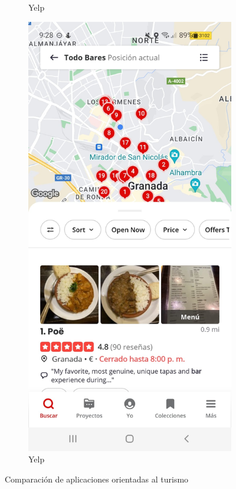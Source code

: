 \begin{figure}[H]
\begin{subfigure}{.3\textwidth}
        \caption{Yelp}
        \label{fig:img5}
    \end{subfigure}%
    \hfill
    \begin{subfigure}{.3\textwidth}
        \centering
        \includegraphics[width=\linewidth]{imagenes/Yelp2.jpeg}
        \caption{Yelp}
        \label{fig:img6}
    \end{subfigure}

    \caption{Comparación de aplicaciones orientadas al turismo}
    \label{fig:comparacion_apps}
\end{figure}

